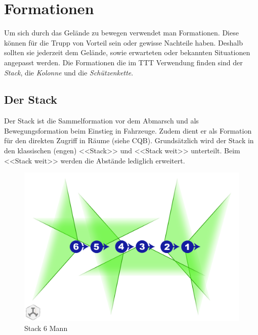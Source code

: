 \section{Formationen}
Um sich durch das Gelände zu bewegen verwendet man Formationen. Diese können für die Trupp von Vorteil sein oder gewisse Nachteile haben. Deshalb sollten sie jederzeit dem Gelände, sowie erwarteten oder bekannten Situationen angepasst werden. Die Formationen die im TTT Verwendung finden sind der \textit{Stack}, die \textit{Kolonne} und die \textit{Schützenkette}. 

\subsection{Der Stack}
Der Stack ist die Sammelformation vor dem Abmarsch und als Bewegungsformation beim Einstieg in Fahrzeuge. Zudem dient er als Formation für den direkten Zugriff in Räume (siehe CQB). %
Grundsätzlich wird der Stack in den klassischen (engen) <<Stack>> und <<Stack weit>> unterteilt. Beim <<Stack weit>> werden die Abstände lediglich erweitert.\par
\begin{figure}[h]
	\centering
	\includegraphics[width=0.7\linewidth]{../img/basic/formation/stack_6mann}
	\caption{Stack 6 Mann}
\end{figure}

